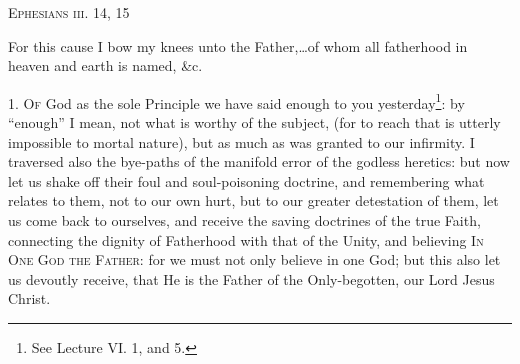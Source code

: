 
\textsc{Ephesians iii. 14, 15}

For this cause I bow my knees unto the Father,…of whom all fatherhood in heaven and earth is named, \&c.

1. \textsc{Of} God as the sole Principle we have said enough to you yesterday\footnote{See Lecture VI. 1, and 5.}: by “enough” I mean, not what is worthy of the subject, (for to reach that is utterly impossible to mortal nature), but as much as was granted to our infirmity. I traversed also the bye-paths of the manifold error of the godless heretics: but now let us shake off their foul and soul-poisoning doctrine, and remembering what relates to them, not to our own hurt, but to our greater detestation of them, let us come back to ourselves, and receive the saving doctrines of the true Faith, connecting the dignity of Fatherhood with that of the Unity, and believing \textsc{In One God the Father}: for we must not only believe in one God; but this also let us devoutly receive, that He is the Father of the Only-begotten, our Lord Jesus Christ.

